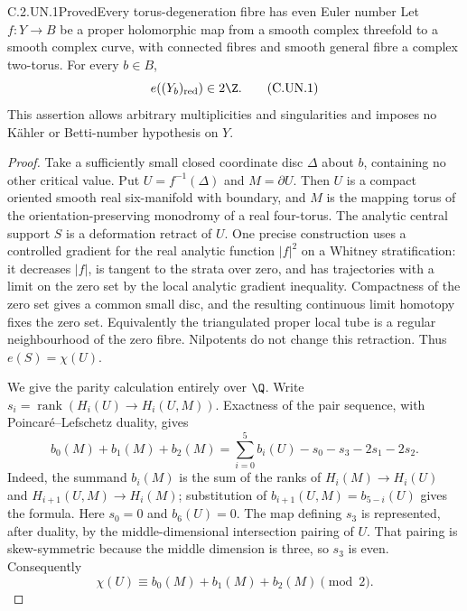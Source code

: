 \begin{statement}{C.2.UN.1}{Proved}{Every torus-degeneration fibre has even Euler number}
Let $f:Y\to B$ be a proper holomorphic map from a smooth complex
threefold to a smooth complex curve, with connected fibres and smooth
general fibre a complex two-torus. For every $b\in B$,
\[
                    e((Y_b)_{\rm red})\in2\Z.       \tag{C.UN.1}
\]
This assertion allows arbitrary multiplicities and singularities and
imposes no K\"ahler or Betti-number hypothesis on $Y$.
\end{statement}
\begin{proof}
Take a sufficiently small closed coordinate disc $\Delta$ about $b$,
containing no other critical value. Put $U=f^{-1}(\Delta)$ and
$M=\partial U$. Then $U$ is a compact oriented smooth real six-manifold
with boundary, and $M$ is the mapping torus of the orientation-preserving
monodromy of a real four-torus. The analytic central support $S$ is a
deformation retract of $U$. One precise construction uses a controlled
gradient for the real analytic function $|f|^2$ on a Whitney
stratification: it decreases $|f|$, is tangent to the strata over zero,
and has trajectories with a limit on the zero set by the local
analytic gradient inequality. Compactness of the zero set gives a
common small disc, and the resulting continuous limit homotopy fixes
the zero set. Equivalently the triangulated proper local tube is a
regular neighbourhood of the zero fibre. Nilpotents do not change this
retraction. Thus $e(S)=\chi(U)$.

We give the parity calculation entirely over $\Q$. Write
$s_i=\operatorname{rank}(H_i(U)\to H_i(U,M))$.
Exactness of the pair sequence, with Poincar\'e--Lefschetz duality,
gives
\[
 b_0(M)+b_1(M)+b_2(M)
       =\sum_{i=0}^{5}b_i(U)-s_0-s_3-2s_1-2s_2.
                                                        \tag{C.UN.2}
\]
Indeed, the summand $b_i(M)$ is the sum of the ranks of
$H_i(M)\to H_i(U)$ and $H_{i+1}(U,M)\to H_i(M)$;
substitution of $b_{i+1}(U,M)=b_{5-i}(U)$ gives the formula.
Here $s_0=0$ and $b_6(U)=0$. The map defining $s_3$ is represented,
after duality, by the middle-dimensional intersection pairing of $U$.
That pairing is skew-symmetric because the middle dimension is three,
so $s_3$ is even. Consequently
\[
 \chi(U)\equiv b_0(M)+b_1(M)+b_2(M)\pmod2.            \tag{C.UN.3}
\]


\end{proof}
